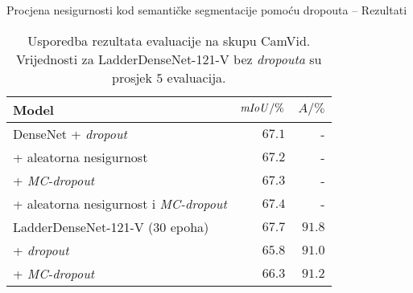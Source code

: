 \documentclass{beamer}
\begin{document}
\begin{frame}[allowframebreaks=0.9]{Procjena nesigurnosti kod semantičke segmentacije pomoću dropouta -- Rezultati}
	\begin{table}
		\centering\small
		\begin{tabular}{lrr}
			\toprule
			\bfseries Model & $\mathit{mIoU}/\%$ & $A/\%$ \\
			\midrule
			DenseNet + \textit{dropout} \citep{Kendall:2017:WUNBDLCV} & $67.1$ & - \\
			+ aleatorna nesigurnost & $67.2$ & - \\
			+ \textit{MC-dropout} & $67.3$ & -  \\
			+ aleatorna nesigurnost i \textit{MC-dropout} & $67.4$ & -\\
			\midrule
			LadderDenseNet-121-V ($30$ epoha) & $67.7$ & $91.8$ \\
			+ \textit{dropout} & $65.8$ & $91.0$ \\
			+ \textit{MC-dropout} & $66.3$ & $91.2$
			\\\bottomrule
		\end{tabular}
		\caption{Usporedba rezultata evaluacije na skupu CamVid. Vrijednosti za LadderDenseNet-121-V bez \textit{dropouta} su prosjek $5$ evaluacija.}
		\label{tab:evaluacija-camvid}
	\end{table}
	

\end{frame}
\end{document}
